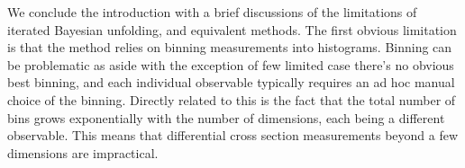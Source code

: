\begin{itemize}
We conclude the introduction with a brief discussions of the limitations of iterated Bayesian unfolding, and equivalent methods. The first obvious limitation is that the method relies on binning measurements into histograms. Binning can be problematic as aside with the exception of few limited case there's no obvious best binning, and each individual observable typically requires an ad hoc manual choice of the binning. Directly related to this is the fact that the total number of bins grows exponentially with the number of dimensions, each being a different observable. This means that differential cross section measurements beyond a few dimensions are impractical.

\end{itemize}
